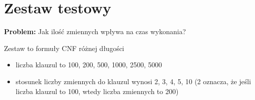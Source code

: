 \documentclass[a4paper,12pt]{article}
\begin{document}
%
%
%
%




%

\newpage
\section{Zestaw testowy}

\noindent
\textbf{Problem:} Jak ilość zmiennych wpływa na czas wykonania?

Zestaw to formuły CNF różnej długości
\begin{itemize}
  \item liczba klauzul to 100, 200, 500, 1000, 2500, 5000
  \item stosunek liczby zmiennych do klauzul wynosi 2, 3, 4, 5, 10 (2 oznacza, że jeśli liczba klauzul to 100, wtedy liczba zmiennych to 200)
\end{itemize}
\end{document}
